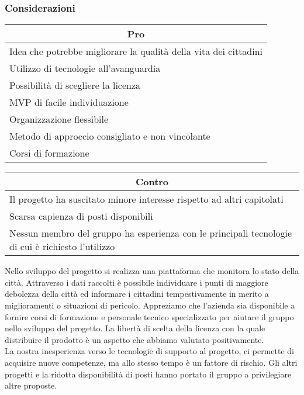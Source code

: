 \subsubsection{Considerazioni}
\begin{minipage}[t]{0.45\linewidth}
    \vspace{0pt}
    {\renewcommand{\arraystretch}{1.5}
    \begin{tabular}{p{1\linewidth}}
        \multicolumn{1}{c}{\textbf{Pro}} \\
        \midrule
        Idea che potrebbe  migliorare la qualità della vita dei cittadini \\
        Utilizzo di tecnologie all'avanguardia \\
        Possibilità di scegliere la licenza \\
        MVP di facile individuazione \\
		Organizzazione flessibile \\
		Metodo di approccio consigliato e non vincolante \\
		Corsi di formazione \\
        \hline
    \end{tabular}
    }
\end{minipage}
\hspace{0.05\linewidth}
\begin{minipage}[t]{0.45\linewidth}
    \vspace{0pt}
    {
    \renewcommand{\arraystretch}{1.5}
    \begin{tabular}{p{1\linewidth}}
        \multicolumn{1}{c}{\textbf{Contro}} \\
        \midrule
        Il progetto ha suscitato minore interesse rispetto ad altri capitolati \\
        Scarsa capienza di posti disponibili \\
        Nessun membro del gruppo ha esperienza con le principali tecnologie di 
		cui è richiesto l'utilizzo \\
        \hline
    \end{tabular}
    }
\end{minipage}
\vspace{1em}

Nello sviluppo del progetto si realizza una piattaforma che monitora lo stato
della città. Attraverso i dati raccolti è possibile individuare i punti di
maggiore debolezza della città ed informare i cittadini tempestivamente in
merito a miglioramenti o situazioni di pericolo. 
Appreziamo che l'azienda sia disponibile a fornire corsi di formazione e
personale tecnico specializzato per aiutare il gruppo nello sviluppo del
progetto. 
La libertà di scelta della licenza con la quale distribuire il prodotto è un
aspetto che abbiamo valutato positivamente. \\
La nostra inesperienza verso le tecnologie di supporto al progetto, ci permette
di acquisire nuove competenze, ma allo stesso tempo è un fattore di rischio.
Gli altri progetti e la ridotta disponibilità di posti hanno portato il gruppo
a privilegiare altre proposte.
